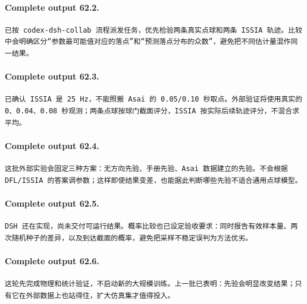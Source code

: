 \documentclass[UTF8,10pt]{ctexart}
\begin{document}
\paragraph{Complete output 62.2.}
\begin{Verbatim}[breaklines=true,breakanywhere=true,fontsize=\scriptsize,frame=single,framesep=2pt]
已按 codex-dsh-collab 流程派发任务，优先检验两条真实点球和两条 ISSIA 轨迹。比较中会明确区分“参数最可能值对应的落点”和“预测落点分布的众数”，避免把不同估计量混作同一结果。
\end{Verbatim}

\paragraph{Complete output 62.3.}
\begin{Verbatim}[breaklines=true,breakanywhere=true,fontsize=\scriptsize,frame=single,framesep=2pt]
已确认 ISSIA 是 25 Hz，不能照搬 Asai 的 0.05/0.10 秒取点。外部验证将使用真实的 0、0.04、0.08 秒观测；两条点球按球门截面评分，ISSIA 按实际后续轨迹评分，不混合求平均。
\end{Verbatim}

\paragraph{Complete output 62.4.}
\begin{Verbatim}[breaklines=true,breakanywhere=true,fontsize=\scriptsize,frame=single,framesep=2pt]
这批外部实验会固定三种方案：无方向先验、手册先验、Asai 数据建立的先验。不会根据 DFL/ISSIA 的答案调参数；这样即使结果变差，也能据此判断哪些先验不适合通用点球模型。
\end{Verbatim}

\paragraph{Complete output 62.5.}
\begin{Verbatim}[breaklines=true,breakanywhere=true,fontsize=\scriptsize,frame=single,framesep=2pt]
DSH 还在实现，尚未交付可运行结果。概率比较也已设定验收要求：同时报告有效样本量、两次随机种子的差异，以及到达截面的概率，避免把采样不稳定误判为方法优劣。
\end{Verbatim}

\paragraph{Complete output 62.6.}
\begin{Verbatim}[breaklines=true,breakanywhere=true,fontsize=\scriptsize,frame=single,framesep=2pt]
这轮先完成物理和统计验证，不启动新的大规模训练。上一批已表明：先验会明显改变结果；只有它在外部数据上也站得住，扩大仿真集才值得投入。
\end{Verbatim}
\end{document}
